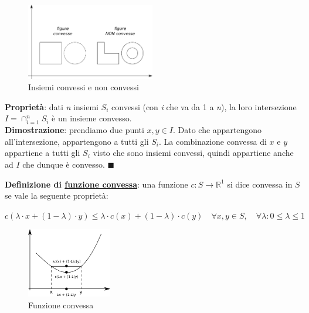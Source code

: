 \documentclass[11pt, oneside]{book}
\begin{document}
\begin{figure}[H]
  \centering
  \includegraphics[width=0.5\textwidth]{images/convessita.png}
  \caption{Insiemi convessi e non convessi}
  \label{convessita}
\end{figure}

\par\bigskip

{\bf Propriet\`a}: dati {\em n} insiemi $S_i$ convessi (con {\em i}
che va da 1 a {\em n}), la loro intersezione $I = \cap_{i=1}^n S_i$ \`e un
insieme convesso.\\
{\bf Dimostrazione}: prendiamo due punti $x, y \in I$. Dato che
appartengono all'intersezione, appartengono a tutti gli $S_i$. La
combinazione convessa di $x$ e $y$ appartiene a tutti gli $S_i$ visto
che sono insiemi convessi, quindi appartiene anche ad $I$ che dunque
\`e convesso. $\blacksquare$

\par\bigskip

{\bf Definizione di \underline{funzione convessa}}: una funzione
$c:S\rightarrow \mathbb{R}^1$ si dice convessa in $S$ se vale la
seguente propriet\`a:

\begin{center}
$c(\lambda\cdot x + (1-\lambda)\cdot y) \leq \lambda\cdot c(x) +
  (1-\lambda)\cdot c(y) \quad \forall x, y \in S, \quad \forall \lambda
  : 0 \leq \lambda \leq 1$
\end{center}

\begin{figure}[H]
  \centering
  \includegraphics[width=0.33\textwidth]{images/funzioneconvessa.png}
  \caption{Funzione convessa}
  \label{funzioneconvessa}
\end{figure}
\end{document}
